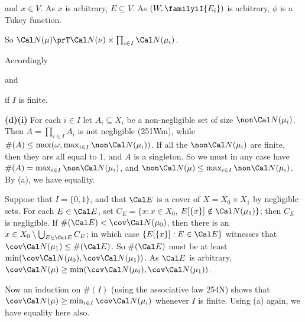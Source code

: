 {

\noindent and $x\in V$.   As $x$ is arbitrary, $E\subseteq V$.   As
$(W,\familyiI{E_i})$ is arbitrary, $\phi$ is a Tukey function.\ \Qed

So $\Cal N(\mu)\prT\Cal N(\nu)\times\prod_{i\in I}\Cal N(\mu_i)$.

\medskip

 Accordingly


\noindent and


\noindent if $I$ is finite.

\medskip

{\bf (d)(i)} For each $i\in I$ let $A_i\subseteq X_i$ be a non-negligible
set of size $\non\Cal N(\mu_i)$.   Then $A=\prod_{i\in I}A_i$ is not
negligible (251Wm), while
$\#(A)\le\max(\omega,\max_{i\in I}\non\Cal N(\mu_i))$.   If all the
$\non\Cal N(\mu_i)$ are finite, then they are all equal to $1$, and $A$ is
a singleton.   So we must in any case have
$\#(A)=\max_{i\in I}\non\Cal N(\mu_i)$, and
$\non\Cal N(\mu)\le\max_{i\in I}\non\Cal N(\mu_i)$.   By (a), we have
equality.

\medskip

 Suppose that $I=\{0,1\}$, and that $\Cal E$ is a cover of
$X=X_0\times X_1$ by negligible sets.   For each $E\in\Cal E$, set
$C_E=\{x:x\in X_0$, $E[\{x\}]\notin\Cal N(\mu_1)\}$;  then $C_E$ is
negligible.   If $\#(\Cal E)<\cov\Cal N(\mu_0)$, then there is an
$x\in X_0\setminus\bigcup_{E\in\Cal E}C_E$;  in which case
$\{E[\{x\}]:E\in\Cal E\}$ witnesses that $\cov\Cal N(\mu_1)\le\#(\Cal E)$.
So $\#(\Cal E)$ must be at least
$\min(\cov\Cal N(\mu_0),\cov\Cal N(\mu_1))$.   As $\Cal E$ is arbitrary,
$\cov\Cal N(\mu)\ge\min(\cov\Cal N(\mu_0),\cov\Cal N(\mu_1))$.

Now an induction on $\#(I)$ (using the associative law 254N) shows that
$\cov\Cal N(\mu)\ge\min_{i\in I}\cov\Cal N(\mu_i)$ whenever $I$ is finite.
Using (a) again, we have equality here also.
}%


